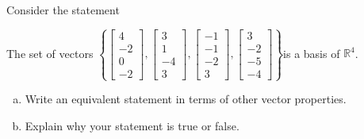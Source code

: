 
\begin{exerciseStatement}


Consider the statement 
\begin{center}\begin{minipage}{0.8\textwidth}
 The set of vectors \( \left\{ \left[\begin{array}{c}
4 \\
-2 \\
0 \\
-2
\end{array}\right] , \left[\begin{array}{c}
3 \\
1 \\
-4 \\
3
\end{array}\right] , \left[\begin{array}{c}
-1 \\
-1 \\
-2 \\
3
\end{array}\right] , \left[\begin{array}{c}
3 \\
-2 \\
-5 \\
-4
\end{array}\right] \right\} \)is a basis of \(\mathbb{R}^4\). 
\end{minipage}\end{center}
    


\begin{enumerate}[(a)]
\item  Write an equivalent statement in terms of other vector properties.
\item  Explain why your statement is true or false.
\end{enumerate}
    
\end{exerciseStatement}
    
